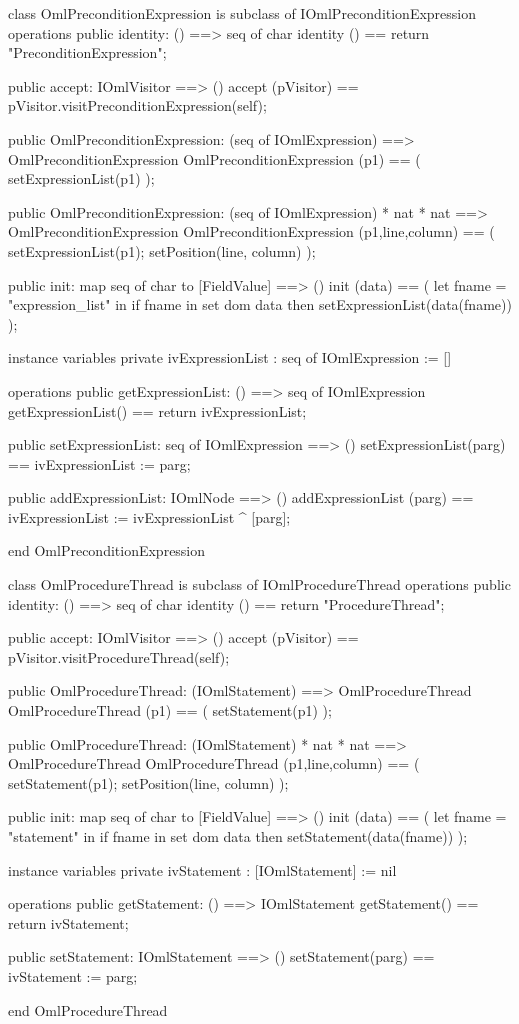\begin{vdm_al}
class OmlPreconditionExpression is subclass of IOmlPreconditionExpression
operations
  public identity: () ==> seq of char
  identity () == return "PreconditionExpression";

  public accept: IOmlVisitor ==> ()
  accept (pVisitor) == pVisitor.visitPreconditionExpression(self);

  public OmlPreconditionExpression:
    (seq of IOmlExpression) ==> OmlPreconditionExpression
  OmlPreconditionExpression (p1) == 
    ( setExpressionList(p1) );

  public OmlPreconditionExpression:
    (seq of IOmlExpression) *
    nat *
    nat ==> OmlPreconditionExpression
  OmlPreconditionExpression (p1,line,column) == 
    ( setExpressionList(p1);
      setPosition(line, column) );

  public init: map seq of char to [FieldValue] ==> ()
  init (data) ==
    ( let fname = "expression_list" in
        if fname in set dom data
        then setExpressionList(data(fname)) );

instance variables
  private ivExpressionList : seq of IOmlExpression := []

operations
  public getExpressionList: () ==> seq of IOmlExpression
  getExpressionList() == return ivExpressionList;

  public setExpressionList: seq of IOmlExpression ==> ()
  setExpressionList(parg) == ivExpressionList := parg;

  public addExpressionList: IOmlNode ==> ()
  addExpressionList (parg) == ivExpressionList := ivExpressionList ^ [parg];

end OmlPreconditionExpression
\end{vdm_al}

\begin{vdm_al}
class OmlProcedureThread is subclass of IOmlProcedureThread
operations
  public identity: () ==> seq of char
  identity () == return "ProcedureThread";

  public accept: IOmlVisitor ==> ()
  accept (pVisitor) == pVisitor.visitProcedureThread(self);

  public OmlProcedureThread:
    (IOmlStatement) ==> OmlProcedureThread
  OmlProcedureThread (p1) == 
    ( setStatement(p1) );

  public OmlProcedureThread:
    (IOmlStatement) *
    nat *
    nat ==> OmlProcedureThread
  OmlProcedureThread (p1,line,column) == 
    ( setStatement(p1);
      setPosition(line, column) );

  public init: map seq of char to [FieldValue] ==> ()
  init (data) ==
    ( let fname = "statement" in
        if fname in set dom data
        then setStatement(data(fname)) );

instance variables
  private ivStatement : [IOmlStatement] := nil

operations
  public getStatement: () ==> IOmlStatement
  getStatement() == return ivStatement;

  public setStatement: IOmlStatement ==> ()
  setStatement(parg) == ivStatement := parg;

end OmlProcedureThread
\end{vdm_al}

